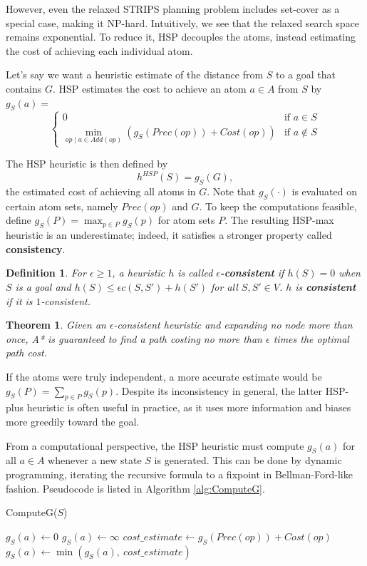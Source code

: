 \documentclass[letterpaper]{article}
\newtheorem{thm}{Theorem}
\newtheorem{defn}{Definition}
\begin{document}
However, even the relaxed STRIPS planning problem includes set-cover as a special case, making it NP-hard.
Intuitively, we see that the relaxed search space remains exponential.
To reduce it, HSP decouples the atoms, instead estimating the cost of achieving each individual atom.

Let's say we want a heuristic estimate of the distance from $S$ to a goal that contains $G$. HSP estimates the cost to achieve an atom $a\in A$ from $S$ by $g_S(a) = $
\[\begin{cases} 0  &\mbox{if } a \in S
\\ \min_{op\mid a\in Add(op)} \left(g_S(Prec(op)) + Cost(op)\right)  &\mbox{if } a \notin S \end{cases}\]

The HSP heuristic is then defined by
\[h^{HSP}(S) = g_S(G),\]
the estimated cost of achieving all atoms in $G$. Note that $g_S(\cdot)$ is evaluated on certain atom sets, namely $Prec(op)$ and $G$.
To keep the computations feasible, define $g_S(P) = \max_{p\in P} g_S(p)$ for atom sets $P$.
The resulting HSP-max heuristic is an underestimate; indeed, it satisfies a stronger property called \textbf{consistency}.

\begin{defn} For $\epsilon\ge 1$, a heuristic $h$ is called \textbf{$\epsilon$-consistent} if $h(S) = 0$ when $S$ is a goal and $h(S) \le \epsilon c(S,S') + h(S')$ for all $S,S'\in V$. $h$ is \textbf{consistent} if it is $1$-consistent. \end{defn}
\begin{thm} Given an $\epsilon$-consistent heuristic and expanding no node more than once, A* is guaranteed to find a path costing no more than $\epsilon$ times the optimal path cost.  \end{thm}

If the atoms were truly independent, a more accurate estimate would be $g_S(P) = \sum_{p\in P} g_S(p)$.
Despite its inconsistency in general, the latter HSP-plus heuristic is often useful in practice, as it uses more information and biases more greedily toward the goal.

From a computational perspective, the HSP heuristic must compute $g_S(a)$ for all $a\in A$ whenever a new state $S$ is generated.
This can be done by dynamic programming, iterating the recursive formula to a fixpoint in Bellman-Ford-like fashion.
Pseudocode is listed in Algorithm \ref{alg:ComputeG}.

\begin{algorithm}
\caption{ComputeG($S$)}
\label{alg:ComputeG}
\begin{algorithmic}
\STATE $g_S(a) \leftarrow 0$
\ELSE
\STATE $g_S(a) \leftarrow \infty$
\ENDIF
\ENDFOR
\REPEAT
{}
\STATE $cost\_estimate \leftarrow g_S(Prec(op)) + Cost(op)$
\STATE $g_S(a) \leftarrow \min \left(g_S(a),~cost\_estimate\right)$
\ENDFOR
\ENDFOR
{}
\end{algorithmic}
\end{algorithm}
\end{document}
